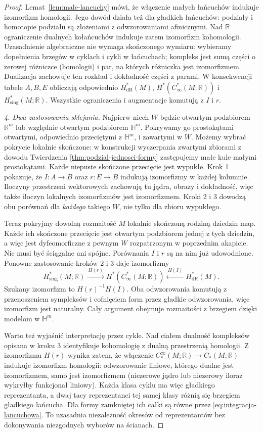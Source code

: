 \documentclass[11pt,a4paper,oneside]{report}
\newcommand{\R}{\mathbb{R}}
\theoremstyle{plain}
\theoremstyle{definition}
\theoremstyle{remark}
\begin{document}
\begin{proof}
Lemat~\ref{lem:male-lancuchy} mówi, że włączenie małych
łańcuchów indukuje izomorfizm homologii. Jego dowód
działa też dla gładkich łańcuchów: podziały i homotopie
podziału są złożeniami z odwzorowaniami afinicznymi.
Nad $\R$ ograniczenie dualnych kołańcuchów indukuje
zatem izomorfizm kohomologii. Uzasadnienie algebraiczne
nie wymaga skończonego wymiaru: wybieramy dopełnienia
brzegów w cyklach i cykli w łańcuchach; kompleks jest
sumą części o zerowej różniczce (homologii) i par,
na których różniczka jest izomorfizmem. Dualizacja
zachowuje ten rozkład i dokładność części z parami.
W konsekwencji tabele $A,B,E$ obliczają odpowiednio
$H^*_{\mathrm{dR}}(M)$, $H^*(C_\infty^*(M;\R))$
i $H^*_{\mathrm{sing}}(M;\R)$.
Wszystkie ograniczenia i augmentacje komutują z $I$ i $r$.

\emph{4. Dwa zastosowania sklejania.}
Najpierw niech $W$ będzie otwartym podzbiorem $\R^m$
lub względnie otwartym podzbiorem $\mathbb H^m$.
Pokrywamy go prostokątami otwartymi, odpowiednio
przeciętymi z $\mathbb H^m$, i zawartymi w $W$.
Możemy wybrać pokrycie lokalnie skończone: w konstrukcji
wyczerpania zwartymi zbiorami z dowodu Twierdzenia
\ref{thm:podzial-jednosci-formy} zastępujemy małe kule
małymi prostokątami. Każde niepuste skończone przecięcie
jest wypukłe. Krok 1 pokazuje, że $I:A\to B$ oraz
$r:E\to B$ indukują izomorfizmy w każdej kolumnie.
Iloczyny przestrzeni wektorowych zachowują tu jądra,
obrazy i dokładność, więc także iloczyn lokalnych
izomorfizmów jest izomorfizmem. Kroki 2 i 3 dowodzą
obu porównań dla \emph{każdego} takiego $W$, nie tylko
dla zbioru wypukłego.

Teraz pokryjmy dowolną rozmaitość $M$ lokalnie skończoną
rodziną dziedzin map. Każde ich skończone przecięcie
jest otwartym podzbiorem jednej z tych dziedzin,
a więc jest dyfeomorficzne z pewnym $W$ rozpatrzonym
w poprzednim akapicie. Nie musi być ściągalne ani spójne.
Porównania $I$ i $r$ są na nim już udowodnione.
Ponowne zastosowanie kroków 2 i 3 daje izomorfizmy
\[
 H^*_{\mathrm{sing}}(M;\R)
 \xrightarrow{\ H(r)\ }H^*(C_\infty^*(M;\R))
 \xleftarrow{\ H(I)\ }H^*_{\mathrm{dR}}(M).
\]
Szukany izomorfizm to $H(r)^{-1}H(I)$.
Oba odwzorowania komutują z przenoszeniem sympleksów
i cofnięciem form przez gładkie odwzorowania, więc
izomorfizm jest naturalny. Cały argument obejmuje
rozmaitości z brzegiem dzięki modelom w $\mathbb H^m$.

Warto też wyjaśnić interpretację przez cykle. Nad ciałem
dualność kompleksów opisana w kroku 3 identyfikuje
kohomologię z dualną przestrzenią homologii.
Z izomorfizmu $H(r)$ wynika zatem, że włączenie
$C_*^\infty(M;\R)\to C_*(M;\R)$ indukuje izomorfizm
homologii: odwzorowanie liniowe, którego dualne jest
izomorfizmem, samo jest izomorfizmem (niezerowe jądro
lub niezerowy iloraz wykryłby funkcjonał liniowy).
Każda klasa cyklu ma więc gładkiego reprezentanta,
a dwaj tacy reprezentanci tej samej klasy różnią się
brzegiem gładkiego łańcucha. Dla formy zamkniętej ich
całki są równe przez \eqref{eq:integracja-lancuchowa}.
To uzasadnia niezależność okresów od reprezentantów
bez dokonywania niezgodnych wyborów na ścianach.
\end{proof}
\end{document}
